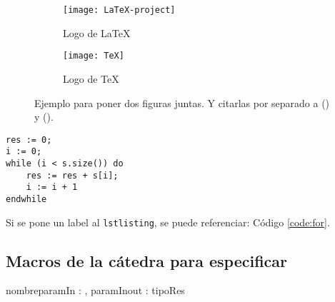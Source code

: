 \documentclass[10pt,a4paper]{article}
\begin{document}
\begin{figure}[ht!]
	\begin{subfigure}{0.5\textwidth}
		\texttt{[image: LaTeX-project]} 
		\caption{Logo de LaTeX}
		\label{fig:subfig1}
	\end{subfigure}
	\begin{subfigure}{0.5\textwidth}
		\texttt{[image: TeX]}
		\caption{Logo de TeX}
		\label{fig:subfig2}
	\end{subfigure}
	\caption{Ejemplo para poner dos figuras juntas. Y citarlas por separado a () y ().}
	\label{fig:subfigs}
\end{figure}



	\begin{lstlisting}[caption={Ejemplo de código (usando los estilos de la cátedra, ver las macros para más detalles)},label=code:for]
res := 0;
i := 0;
while (i < s.size()) do
	res := res + s[i];
	i := i + 1
endwhile
	\end{lstlisting}

Si se pone un label al \verb|lstlisting|, se puede referenciar: Código \ref{code:for}.


\subsection{Macros de la cátedra para especificar}

\begin{proc}{nombre}{\In paramIn : \nat, \Inout paramInout : \TLista{\ent}}{tipoRes}
\end{proc}

\end{document}
